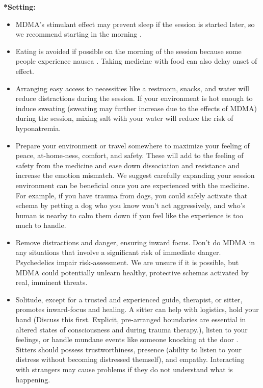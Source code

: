\documentclass[12pt,letterpaper]{book}
\begin{document}
\noindent \textbf{*Setting:}
\begin{itemize}
    \item MDMA's stimulant effect may prevent sleep if the session is started later, so we recommend starting in the morning \cite{berro2018acute}.
    \item Eating is avoided if possible on the morning of the session because some people experience nausea \cite{mithoeferManual}. Taking medicine with food can also delay onset of effect.
    \item Arranging easy access to necessities like a restroom, snacks, and water will reduce distractions during the session. If your environment is hot enough to induce sweating (sweating may further increase due to the effects of MDMA) during the session, mixing salt with your water will reduce the risk of hyponatremia.
    \label{contextexpansion}
    \item Prepare your environment or travel somewhere to maximize your feeling of peace, at-home-ness, comfort, and safety. These will add to the feeling of safety from the medicine and ease down dissociation and resistance and increase the emotion mismatch. We suggest carefully expanding your session environment can be beneficial once you are experienced with the medicine. For example, if you have trauma from dogs, you could safely activate that schema by petting a dog who you know won't act aggressively, and who's human is nearby to calm them down if you feel like the experience is too much to handle.
    \item Remove distractions and danger, ensuring inward focus. Don’t do MDMA in any situations that involve a significant risk of immediate danger. Psychedelics impair risk-assessment. We are unsure if it is possible, but MDMA could potentially unlearn healthy, protective schemas activated by real, imminent threats.
\label{def:sitter}
    \item Solitude, except for a trusted and experienced guide, therapist, or sitter, promotes inward-focus and healing. A sitter can help with logistics, hold your hand (Discuss this first. Explicit, pre-arranged boundaries are essential in altered states of consciousness and during trauma therapy.), listen to your feelings, or handle mundane events like someone knocking at the door \cite{mithoeferManual,thalSitter}. Sitters should possess trustworthiness, presence (ability to listen to your distress without becoming distressed themself), and empathy. Interacting with strangers may cause problems if they do not understand what is happening.  
\end{itemize}
\end{document}
